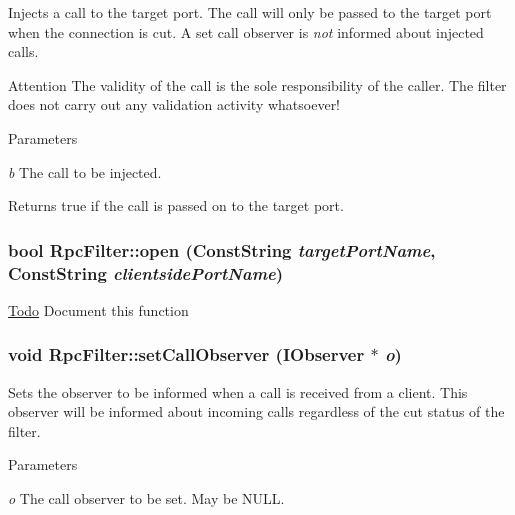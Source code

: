 \label{classyarp_1_1os_1_1_rpc_filter_a18789775d8040efabf1bc8df5d0f1c86}
Injects a call to the target port. The call will only be passed to the target port when the connection is cut. A set call observer is {\itshape not\/} informed about injected calls.

\begin{DoxyAttention}{Attention}
The validity of the call is the sole responsibility of the caller. The filter does not carry out any validation activity whatsoever! 
\end{DoxyAttention}

\begin{DoxyParams}{Parameters}
\item[{\em b}]The call to be injected. \end{DoxyParams}
\begin{DoxyReturn}{Returns}
{\ttfamily true} if the call is passed on to the target port. 
\end{DoxyReturn}
\hypertarget{classyarp_1_1os_1_1_rpc_filter_adeb2b65f313a9ef7986244d81fdab354}{
\subsubsection[{open}]{\setlength{\rightskip}{0pt plus 5cm}bool RpcFilter::open (ConstString {\em targetPortName}, \/  ConstString {\em clientsidePortName})}}
\label{classyarp_1_1os_1_1_rpc_filter_adeb2b65f313a9ef7986244d81fdab354}
\begin{Desc}
\item[\hyperlink{todo__todo000008}{Todo}]Document this function \end{Desc}
\hypertarget{classyarp_1_1os_1_1_rpc_filter_a36f86ee737cfff2cb29b8b0187bffe84}{
\subsubsection[{setCallObserver}]{\setlength{\rightskip}{0pt plus 5cm}void RpcFilter::setCallObserver ({\bf IObserver} $\ast$ {\em o})}}
\label{classyarp_1_1os_1_1_rpc_filter_a36f86ee737cfff2cb29b8b0187bffe84}
Sets the observer to be informed when a call is received from a client. This observer will be informed about incoming calls regardless of the cut status of the filter. 
\begin{DoxyParams}{Parameters}
\item[{\em o}]The call observer to be set. May be {\ttfamily NULL}. \end{DoxyParams}
